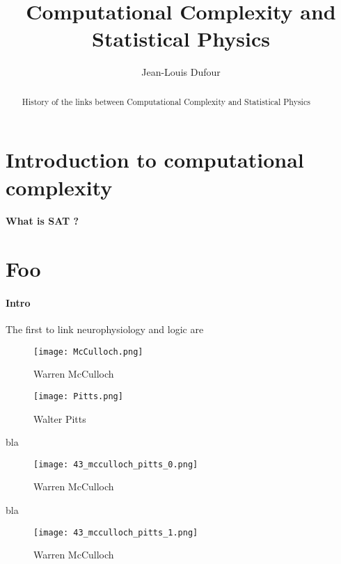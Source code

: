 \documentclass[a4paper]{article}
\title{Computational Complexity and Statistical Physics}
\author{Jean-Louis Dufour}
\begin{document}
\maketitle

\begin{abstract}
History of the links between Computational Complexity and Statistical Physics
\end{abstract}

\section{Introduction to computational complexity} \label{section:Introduction}

\paragraph{What is SAT ?}





\section{Foo}

\paragraph*{Intro}

The first to link neurophysiology and logic are \cite{mcculloch1943logical}

\begin{figure}[h]
  \centering
  \begin{minipage}[b]{0.55\textwidth}
    \texttt{[image: McCulloch.png]}
    \caption{Warren McCulloch}
  \end{minipage}
  \hfill
  \begin{minipage}[b]{0.4\textwidth}
    \texttt{[image: Pitts.png]}
    \caption{Walter Pitts}
  \end{minipage}
\end{figure}

bla

\begin{figure}[h]
\texttt{[image: 43\_mcculloch\_pitts\_0.png]}
\caption{Warren McCulloch}
\end{figure}

bla

\begin{figure}[h]
\texttt{[image: 43\_mcculloch\_pitts\_1.png]}
\caption{Warren McCulloch}
\end{figure}
\end{document}
